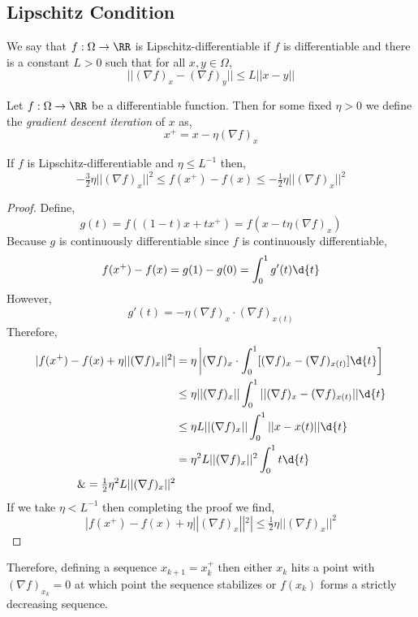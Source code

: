 \documentclass[12pt]{article}
\begin{document}
\subsection{Lipschitz Condition}

\begin{defn}
We say that $f : \Omega \to \RR$ is Lipschitz-differentiable if $f$ is differentiable and there is a constant $L > 0$ such that for all $x, y \in \Omega$,
\[ || (\nabla f)_x - (\nabla f)_y || \le L || x - y || \]
\end{defn}

\begin{defn}
Let $f : \Omega \to \RR$ be a differentiable function. Then for some fixed $\eta > 0$ we define the \textit{gradient descent iteration} of $x$ as,
\[ x^+ = x - \eta (\nabla f)_x \]
\end{defn}

\begin{lemma}
If $f$ is Lipschitz-differentiable and $\eta \le L^{-1}$ then,
\[ - \tfrac{3}{2} \eta || (\nabla f)_x ||^2 \le f(x^+) - f(x) \le - \tfrac{1}{2} \eta || (\nabla f)_x ||^2 \]
\end{lemma}

\begin{proof}
Define,
\[ g(t) = f((1-t) x + t x^+) = f(x - t \eta (\nabla f)_x) \]
Because $g$ is continuously differentiable since $f$ is continuously differentiable,
\[ f(x^+) - f(x) = g(1) - g(0) = \int_0^1 g'(t) \d{t} \]
However,
\[ g'(t) = - \eta (\nabla f)_x \cdot (\nabla f)_{x(t)} \]
Therefore,
\begin{align*}
| f(x^+) - f(x) + \eta || (\nabla f)_x ||^2| &= \eta \left| (\nabla f)_x \cdot \int_0^1 [(\nabla f)_x - (\nabla f)_{x(t)} ] \d{t} \right]
\\
& \le \eta || (\nabla f)_x || \int_0^1 || (\nabla f)_x - (\nabla f)_{x(t)} || \d{t} 
\\
& \le \eta L || (\nabla f)_x || \int_0^1 || x - x(t) || \d{t}
\\
& = \eta^2 L || (\nabla f)_x ||^2 \int_0^1 t \d{t}
\\
\& = \tfrac{1}{2} \eta^2 L || (\nabla f)_x ||^2 
\end{align*}
If we take $\eta < L^{-1}$ then completing the proof we find,
\[ | f(x^+) - f(x) + \eta || (\nabla f)_x ||^2| \le \tfrac{1}{2} \eta || (\nabla f)_x ||^2 \]
\end{proof}

\begin{rmk}
Therefore, defining a sequence $x_{k+1} = x_k^+$ then either $x_k$ hits a point with $(\nabla f)_{x_k} = 0$ at which point the sequence stabilizes or $f(x_k)$ forms a strictly decreasing sequence.
\end{rmk}
\end{document}

